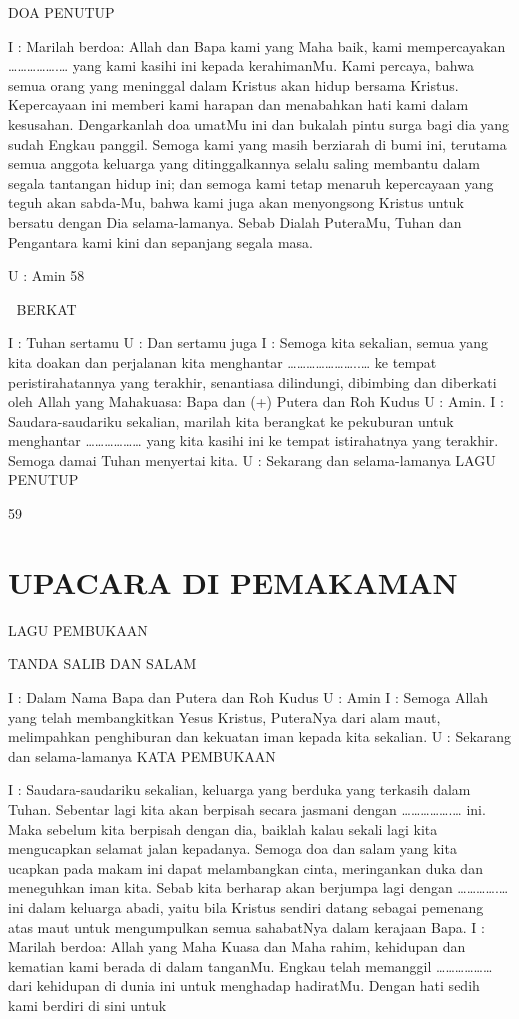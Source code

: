 \documentclass[10pt,a5paper,fancyhdr]{memoir}
\begin{document}
DOA PENUTUP 

I : Marilah berdoa: 
Allah dan Bapa kami yang Maha baik, kami mempercayakan 
…………….… yang kami kasihi ini kepada kerahimanMu. Kami 
percaya, bahwa semua orang yang meninggal dalam Kristus akan 
hidup bersama Kristus. Kepercayaan ini memberi kami harapan dan 
menabahkan hati kami dalam kesusahan. Dengarkanlah doa umatMu 
ini dan bukalah pintu surga bagi dia yang sudah Engkau panggil. 
Semoga kami yang masih berziarah di bumi ini, terutama semua 
anggota keluarga yang ditinggalkannya selalu saling membantu 
dalam segala tantangan hidup ini; dan semoga kami tetap menaruh 
kepercayaan yang teguh akan sabda-Mu, bahwa kami juga akan 
menyongsong Kristus untuk bersatu dengan Dia selama-lamanya. 
Sebab Dialah PuteraMu, Tuhan dan Pengantara kami kini dan 
sepanjang segala masa. 

U : Amin 
58 



BERKAT 

I : Tuhan sertamu 
U : Dan sertamu juga 
I : Semoga kita sekalian, semua yang kita doakan dan perjalanan kita 
menghantar …………………..… ke tempat peristirahatannya yang 
terakhir, senantiasa dilindungi, dibimbing dan diberkati oleh Allah 
yang Mahakuasa: Bapa dan (+) Putera dan Roh Kudus 
U : Amin. 
I : Saudara-saudariku sekalian, marilah kita berangkat ke pekuburan 
untuk menghantar ……………… yang kita kasihi ini ke tempat 
istirahatnya yang terakhir. Semoga damai Tuhan menyertai kita. 
U : Sekarang dan selama-lamanya 
LAGU PENUTUP 

59 



\chapter{UPACARA DI PEMAKAMAN} 

LAGU PEMBUKAAN 

TANDA SALIB DAN SALAM 

I : Dalam Nama Bapa dan Putera dan Roh Kudus 
U : Amin 
I : Semoga Allah yang telah membangkitkan Yesus Kristus, 
PuteraNya dari alam maut, melimpahkan penghiburan dan kekuatan 
iman kepada kita sekalian. 
U : Sekarang dan selama-lamanya 
KATA PEMBUKAAN 

I : Saudara-saudariku sekalian, keluarga yang berduka yang terkasih 
dalam Tuhan. Sebentar lagi kita akan berpisah secara jasmani dengan 
…………….… ini. Maka sebelum kita berpisah dengan dia, baiklah 
kalau sekali lagi kita mengucapkan selamat jalan kepadanya. Semoga 
doa dan salam yang kita ucapkan pada makam ini dapat 
melambangkan cinta, meringankan duka dan meneguhkan iman kita. 
Sebab kita berharap akan berjumpa lagi dengan ………….… ini 
dalam keluarga abadi, yaitu bila Kristus sendiri datang sebagai 
pemenang atas maut untuk mengumpulkan semua sahabatNya dalam 
kerajaan Bapa. 
I : Marilah berdoa: 
Allah yang Maha Kuasa dan Maha rahim, kehidupan dan kematian 
kami berada di dalam tanganMu. Engkau telah memanggil 
……………… dari kehidupan di dunia ini untuk menghadap 
hadiratMu. Dengan hati sedih kami berdiri di sini untuk 
\end{document}
